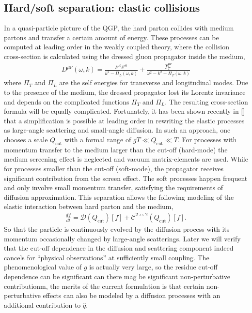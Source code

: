\subsection{Hard/soft separation: elastic collisions}
In a quasi-particle picture of the QGP, the hard parton collides with medium partons and transfer a certain amount of energy.
These processes can be computed at leading order in the weakly coupled theory, where the collision cross-section is calculated using the dressed gluon propagator inside the medium,
\begin{eqnarray}
D^{\mu\nu}(\omega, k) = \frac{\delta^{\mu 0}\delta^{\nu 0}}{k^2 - \Pi_L(\omega, k)} + \frac{\hat{P}_T^{\mu\nu}}{\omega^2 - k^2 - \Pi_T(\omega, k)}
\end{eqnarray}
where $\Pi_T$ and $\Pi_L$ are the self energies for transverse and longitudinal modes.
Due to the presence of the medium, the dressed propagator lost its Lorentz invariance and depends on the complicated functions $\Pi_T$ and $\Pi_L$.
The resulting cross-section formula will be equally complicated.
Fortunately, it has been shown recently in [] that a simplification is possible at leading order in rewriting the elastic processes as large-angle scattering and small-angle diffusion.
In such an approach, one chooses a scale $Q_\textrm{cut}$ with a formal range of $gT \ll Q_\textrm{cut} \ll T$.
For processes with momentum transfer to the medium larger than the cut-off  (hard-mode) the medium screening effect is neglected and vacuum matrix-elements are used.
While for processes smaller than the cut-off (soft-mode), the propagator receives significant contribution from the screen effect.
The soft processes happen frequent and only involve small momentum transfer, satisfying the requirements of diffusion approximation.
This separation allows the following modeling of the elastic interaction between hard parton and the medium,
\begin{eqnarray}
\frac{df}{dt} = \mathcal{D}(Q_{\textrm{cut}})[f] + \mathcal{C}^{2\leftrightarrow 2}(Q_{\textrm{cut}})[f].
\end{eqnarray}
So that the particle is continuously evolved by the diffusion process with its momentum occasionally changed by large-angle scatterings.
Later we will verify that the cut-off dependence in the diffusion and scattering component indeed cancels for ``physical observations'' at sufficiently small coupling.
The phenomenological value of $g$ is actually very large, so the residue cut-off dependence can be significant can there mag be significant non-perturbative contributionm, the merits of the current formulation is that certain  non-perturbative effects can also be modeled by a diffusion processes with an additional contribution to $\hat{q}$.


